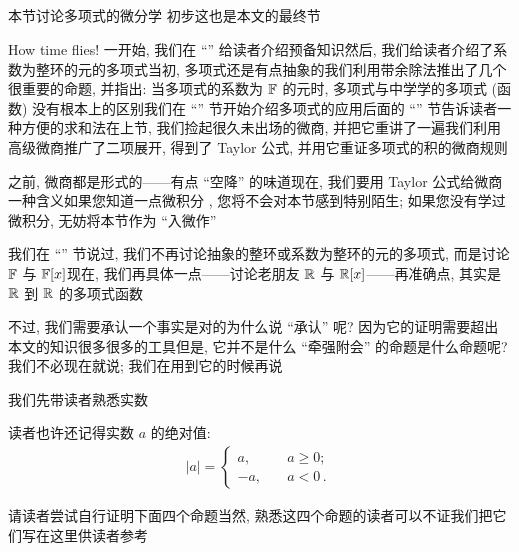 \subsection*{\IntroductionToDifferentialCalculusOnPolynomials}
\markright{\IntroductionToDifferentialCalculusOnPolynomials}

本节讨论多项式的微分学  初步\period 这也是本文的最终节\period

How time flies! 一开始, 我们在 ``\Prerequisites '' 给读者介绍预备知识\period 然后, 我们给读者介绍了系数为整环的元的多项式\period 当初, 多项式还是有点抽象的\period 我们利用带余除法推出了几个很重要的命题, 并指出: 当多项式的系数为 $\mathbb{F}$ 的元时, 多项式与中学学的多项式 (函数) 没有根本上的区别\period 我们在 ``\Interpolation '' 节开始介绍多项式的应用\period 后面的 ``\SummationFormulae '' 节告诉读者一种方便的求和法\period 在上节, 我们捡起很久未出场的微商, 并把它重讲了一遍\period 我们利用高级微商推广了二项展开, 得到了 Taylor 公式, 并用它重证多项式的积的微商规则\period

之前, 微商都是形式的——有点 ``空降'' 的味道\period 现在, 我们要用 Taylor 公式给微商一种含义\period 如果您知道一点微积分 , 您将不会对本节感到特别陌生; 如果您没有学过微积分, 无妨将本节作为 ``入微作''\period

我们在 ``\PolynomialsOverF '' 节说过, 我们不再讨论抽象的整环或系数为整环的元的多项式, 而是讨论 $\mathbb{F}$ 与 $\mathbb{F}[x]$\period 现在, 我们再具体一点——讨论老朋友 $\mathbb{R}$ 与 $\mathbb{R}[x]$——再准确点, 其实是 $\mathbb{R}$ 到 $\mathbb{R}$ 的多项式函数\period

不过, 我们需要承认一个事实是对的\period 为什么说 ``承认'' 呢? 因为它的证明需要超出本文的知识很多很多的工具\period 但是, 它并不是什么 ``牵强附会'' 的命题\period 是什么命题呢? 我们不必现在就说; 我们在用到它的时候再说\period

我们先带读者熟悉实数\period

读者也许还记得实数 $a$ 的绝对值:
\begin{align*}
    |a| = \begin{cases}
        a,  & \quad a \geq 0;     \\
        -a, & \quad a < 0 \period
    \end{cases}
\end{align*}

请读者尝试自行证明下面四个命题\period 当然, 熟悉这四个命题的读者可以不证\period 我们把它们写在这里供读者参考\period

